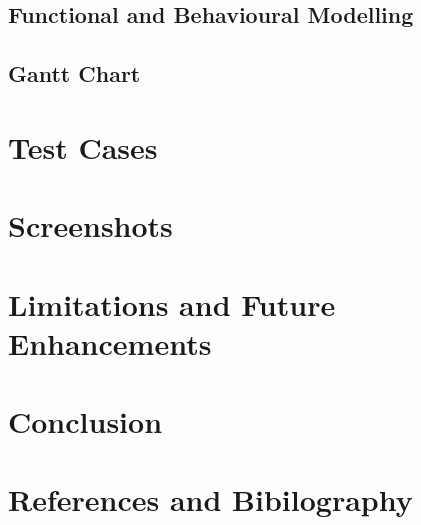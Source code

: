 \documentclass[12pt,a4paper]{report}
\begin{document}
\section{Functional and Behavioural Modelling}\label{sec:functional_and_behavioural_modelling}
\section{Gantt Chart}\label{sec:gantt_chart}
\newpage
\chapter{Test Cases}\label{cha:test_cases}
\newpage
\chapter{Screenshots}\label{cha:screenshots}
\newpage
\chapter{Limitations and Future Enhancements}\label{cha:limitations_and_future_enhancements}
\newpage
\chapter{Conclusion}\label{cha:conclusion}
\newpage
\chapter{References and Bibilography}\label{cha:references_and_bibilography}
\end{document}
